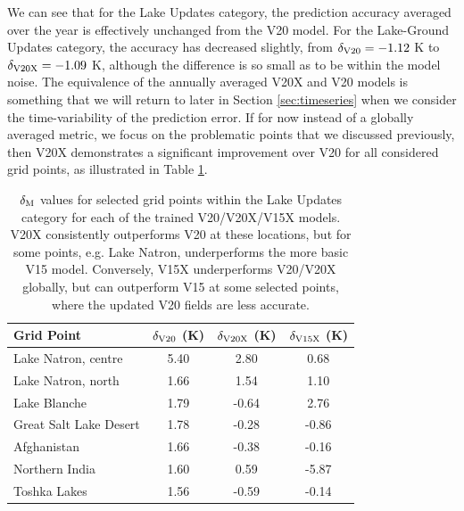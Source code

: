 \documentclass[twocolumn]{article}
\begin{document}
	\noindent We can see that for the Lake Updates category, the prediction accuracy averaged over the year is effectively unchanged from the V20 model. For the Lake-Ground Updates category, the accuracy has decreased slightly, from $\delta_{\rm V20} = -1.12$ K to $\delta_{\rm V20X} = -1.09$ K, although the difference is so small as to be within the model noise. The equivalence of the annually averaged V20X and V20 models is something that we will return to later in Section \ref{sec:timeseries} when we consider the time-variability of the prediction error. If for now instead of a globally averaged metric, we focus on the problematic points that we discussed previously, then V20X demonstrates a significant improvement over V20 for all considered grid points, as illustrated in Table \ref{tab:lake_v20X}. 
	\begin{table}
		\centering
		\begin{tabular}{lccc}
			Grid Point & $\delta_{\rm V20}$ (K) & $\delta_{\rm V20X}$ (K)  & $\delta_{\rm V15X}$ (K) \\
			\hline
			Lake Natron, centre       & 5.40 & 2.80  & 0.68 \\
			Lake Natron, north          & 1.66 & 1.54   & 1.10 \\
			Lake Blanche                  & 1.79  & -0.64 & 2.76 \\
			Great Salt Lake Desert  & 1.78  & -0.28  &-0.86  \\
			Afghanistan                     & 1.66 & -0.38  & -0.16 \\
			Northern India                 & 1.60 &0.59  & -5.87 \\
			Toshka Lakes                  & 1.56 & -0.59 & -0.14 \\
			\hline
		\end{tabular}
		\caption{$\delta_{\rm M}$ values for selected grid points within the Lake Updates category for each of the trained V20/V20X/V15X models. V20X consistently outperforms V20 at these locations, but for some points, e.g. Lake Natron, underperforms the more basic V15 model. Conversely, V15X underperforms V20/V20X globally, but can outperform V15 at some selected points, where the updated V20 fields are less accurate.}
		\label{tab:lake_v20X}
	\end{table}
\end{document}
